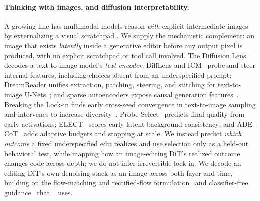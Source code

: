 \paragraph{Thinking with images, and diffusion interpretability.} A
growing line has multimodal models reason \emph{with} explicit
intermediate images by externalizing a visual scratchpad
\citep{hu2024sketchpad,wu2024vot,li2025mvot}. We supply the mechanistic
complement: an image that exists \emph{latently} inside a generative editor before any
output pixel is produced, with no explicit scratchpad or tool call involved.
The Diffusion Lens~\citep{toker2024diffusionlens} decodes a
text-to-image model's \emph{text encoder}; DiffLens and
ICM~\citep{shi2025difflens,zaleska2026icm} probe and steer internal
features, including choices absent from an underspecified prompt; DreamReader
unifies extraction, patching, steering, and stitching for text-to-image
U-Nets~\citep{sykora2026dreamreader}; and sparse autoencoders expose causal
generation features~\citep{surkov2025sae}. Breaking the Lock-in finds early
cross-seed convergence in text-to-image sampling and intervenes to increase
diversity~\citep{zhu2026lockin}. Probe-Select~\citep{guo2026probeselect}
predicts final quality from early activations;
ELECT~\citep{kim2025elect} scores early latent background consistency;
and ADE-CoT~\citep{qu2026adecot} adds adaptive budgets
and stopping at scale. We instead predict \emph{which outcome} a fixed
underspecified edit realizes and use selection only as a held-out behavioral
test, while mapping how an image-editing DiT's realized outcome changes code
across depth; we do not infer irreversible lock-in. We decode an
editing DiT's own denoising
stack as an image across both layer and time, building on the flow-matching
and rectified-flow formulation~\citep{lipman2023flowmatching,liu2023rectifiedflow}
and classifier-free guidance~\citep{ho2022cfg} that
\model{}~\citep{qwen2025image,peebles2023dit} uses.

